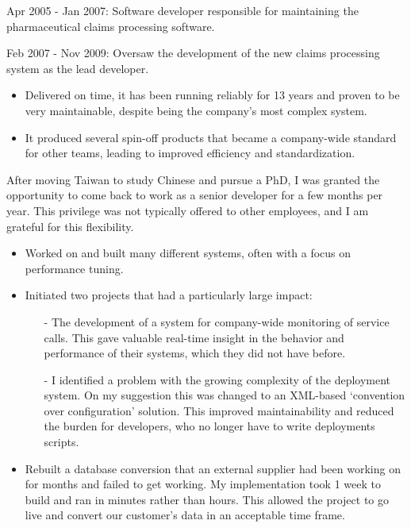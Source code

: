 \documentclass[10pt,a4paper]{../altacv}
\begin{document}
Apr 2005 - Jan 2007: Software developer responsible for maintaining the pharmaceutical claims processing software.

\medskip

Feb 2007 - Nov 2009: Oversaw the development of the new claims processing system as the lead developer.
\begin{itemize}
	\item\small{Delivered on time, it has been running reliably for 13 years and proven to be very maintainable, despite being the company's most complex system.}
	\item\small{It produced several spin-off products that became a company-wide standard for other teams, leading to improved efficiency and standardization.}
\end{itemize}

\medskip

After moving Taiwan to study Chinese and pursue a PhD, I was granted the opportunity to come back to work as a senior developer for a few months per year. This privilege was not typically offered to other employees, and I am grateful for this flexibility.


\begin{itemize}
	\item\small{Worked on and built many different systems, often with a focus on performance tuning.}
	\item\small{Initiated two projects that had a particularly large impact:
	\begin{itemize}
		\item[-]\small{The development of a system for company-wide monitoring of service calls. This gave valuable real-time insight in the behavior and performance of their systems, which they did not have before.}
		\item[-]\small{I identified a problem with the growing complexity of the deployment system. On my suggestion this was changed to an XML-based ‘convention over configuration' solution. This improved maintainability and reduced the burden for developers, who no longer have to write deployments scripts.}
	\end{itemize}
	}
	\item\small{Rebuilt a database conversion that an external supplier had been working on for months and failed to get working. My implementation took 1 week to build and ran in minutes rather than hours. This allowed the project to go live and convert our customer's data in an acceptable time frame.}
\end{itemize}
\end{document}

